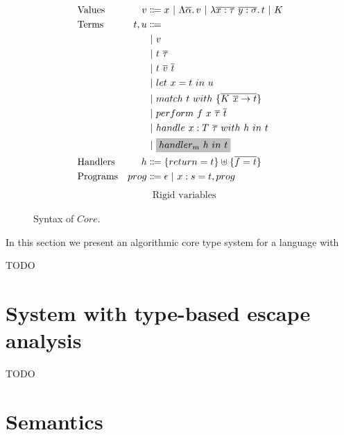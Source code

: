 \documentclass[acmsmall]{acmart}
\newcommand{\graybox}[1]{\colorbox{lightgray}{$\displaystyle #1$}}
\newcommand{\vor}{~|~}
\newcommand{\ap}{~}
\begin{document}
\begin{figure}
    \centering
    \begin{multicols}{2}
        \begin{align*}
            &\text{Values} &v &\Coloneqq x \vor \Lambda \overline{\alpha} \ldotp v \vor \lambda \overline{x : \tau}~\overline{y : \sigma}\ldotp t \vor K
            \\
            &\text{Terms} &t, u &\Coloneqq \\
            &&&\vor v \\
            &&&\vor t\ap\overline{\tau} \\
            &&&\vor t \ap \overline{v} \ap \overline{t} \\
            &&&\vor let ~ x = t ~ in ~ u \\
            &&&\vor match ~ t ~ with ~\{\overline{K \ap \overline{x} \to t}\} \\
            &&&\vor perform ~ f \ap x \ap \overline{\tau} \ap \overline{t} \\
            &&&\vor handle ~ x : T \ap \overline{\tau} ~with ~h~in ~t \\
            &&&\vor \graybox{handler_m ~ h ~ in ~ t}
            \\
            &\text{Handlers} &h &\Coloneqq \{return = t\} \uplus \{ \overline{f = t} \}
            \\
            &\text{Programs} &prog &\Coloneqq \epsilon \vor x : s = t, prog
        \end{align*}
        \columnbreak
        \begin{align*}
            &\text{Rigid variables}
        \end{align*}
    \end{multicols}
    \caption{Syntax of $Core$.}
    \label{fig:core-syntax}
\end{figure}




In this section we present an algorithmic core type system for a language with

TODO %


\section{System with type-based escape analysis} \label{sec:escape}

TODO %


\section{Semantics} \label{sec:semantics}
\end{document}

